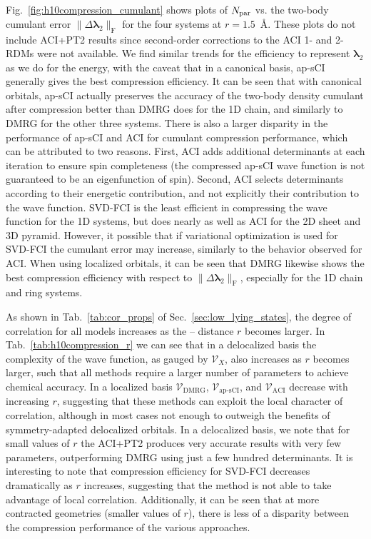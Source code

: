 \documentclass[aip,jcp,amsmath,amssymb, preprint]{revtex4-1}
\newcommand*{\ncomp}{\mathcal{V}_X}
\providecommand{\norm}[1]{\lVert#1\rVert}
\begin{document}
Fig.~\ref{fig:h10compression_cumulant} shows plots of $N_{\rm{par}}$ vs. the two-body cumulant error $\norm{\Delta\pmb{\lambda}_{2}}_\mathrm{F}$ for the four  systems at $r=1.5$~{\AA}.
These plots do not include ACI+PT2 results since second-order corrections to the ACI 1- and 2-RDMs were not available.
We find similar trends for the efficiency to represent $\pmb{\lambda}_{2}$ as we do for the energy, with the caveat that in a canonical basis, ap-sCI generally gives the best compression efficiency.
It can be seen that with canonical orbitals, ap-sCI actually preserves the accuracy of the two-body density cumulant after compression better than DMRG does for the 1D chain, and similarly to DMRG for the other three systems.
There is also a larger disparity in the performance of ap-sCI and ACI for cumulant compression performance, which can be attributed to two reasons. 
First, ACI adds additional determinants at each iteration to ensure spin completeness (the compressed ap-sCI wave function is not guaranteed to be an eigenfunction of spin). 
Second, ACI selects determinants according to their energetic contribution, and not explicitly their contribution to the wave function.
SVD-FCI is the least efficient in compressing the wave function for the 1D systems, but does nearly as well as ACI for the 2D sheet and 3D pyramid.
However, it possible that if variational optimization is used for SVD-FCI the cumulant error may increase, similarly to the behavior observed for ACI.
When using localized orbitals, it can be seen that DMRG likewise shows the best compression efficiency with respect to $\norm{\Delta\pmb{\lambda}_{2}}_\mathrm{F}$, especially for the 1D chain and ring systems.

As shown in Tab.~\ref{tab:cor_props} of Sec.~\ref{sec:low_lying_states}, the degree of correlation for all models increases as the --  distance $r$ becomes larger. 
In Tab.~\ref{tab:h10compression_r} we can see that in a delocalized basis the complexity of the wave function, as gauged by $\ncomp$, also increases as $r$ becomes larger, such that all methods require a larger number of parameters to achieve chemical accuracy.
In a localized basis $\mathcal{V}_{\text{DMRG}}$, $\mathcal{V}_{\text{ap-sCI}}$, and $\mathcal{V}_{\text{ACI}}$ decrease with increasing $r$, suggesting that these methods can exploit the local character of correlation, although in most cases not enough to outweigh the benefits of symmetry-adapted delocalized orbitals.
In a delocalized basis, we note that for small values of $r$ the ACI+PT2 produces very accurate results with very few parameters, outperforming DMRG using just a few hundred determinants.
It is interesting to note that compression efficiency for SVD-FCI decreases dramatically as $r$ increases, suggesting that the method is not able to take advantage of local correlation.  
Additionally, it can be seen that at more contracted geometries (smaller values of $r$), there is less of a disparity between the compression performance of the various approaches.
\end{document}
